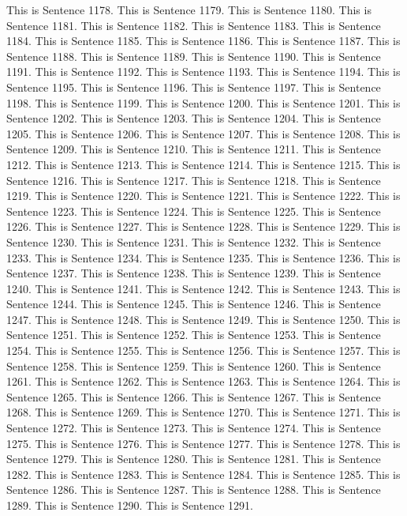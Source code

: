 \documentclass{article}
\begin{document}
This is Sentence 1178.
This is Sentence 1179.
This is Sentence 1180.
This is Sentence 1181.
This is Sentence 1182.
This is Sentence 1183.
This is Sentence 1184.
This is Sentence 1185.
This is Sentence 1186.
This is Sentence 1187.
This is Sentence 1188.
This is Sentence 1189.
This is Sentence 1190.
This is Sentence 1191.
This is Sentence 1192.
This is Sentence 1193.
This is Sentence 1194.
This is Sentence 1195.
This is Sentence 1196.
This is Sentence 1197.
This is Sentence 1198.
This is Sentence 1199.
This is Sentence 1200.
This is Sentence 1201.
This is Sentence 1202.
This is Sentence 1203.
This is Sentence 1204.
This is Sentence 1205.
This is Sentence 1206.
This is Sentence 1207.
This is Sentence 1208.
This is Sentence 1209.
This is Sentence 1210.
This is Sentence 1211.
This is Sentence 1212.
This is Sentence 1213.
This is Sentence 1214.
This is Sentence 1215.
This is Sentence 1216.
This is Sentence 1217.
This is Sentence 1218.
This is Sentence 1219.
This is Sentence 1220.
This is Sentence 1221.
This is Sentence 1222.
This is Sentence 1223.
This is Sentence 1224.
This is Sentence 1225.
This is Sentence 1226.
This is Sentence 1227.
This is Sentence 1228.
This is Sentence 1229.
This is Sentence 1230.
This is Sentence 1231.
This is Sentence 1232.
This is Sentence 1233.
This is Sentence 1234.
This is Sentence 1235.
This is Sentence 1236.
This is Sentence 1237.
This is Sentence 1238.
This is Sentence 1239.
This is Sentence 1240.
This is Sentence 1241.
This is Sentence 1242.
This is Sentence 1243.
This is Sentence 1244.
This is Sentence 1245.
This is Sentence 1246.
This is Sentence 1247.
This is Sentence 1248.
This is Sentence 1249.
This is Sentence 1250.
This is Sentence 1251.
This is Sentence 1252.
This is Sentence 1253.
This is Sentence 1254.
This is Sentence 1255.
This is Sentence 1256.
This is Sentence 1257.
This is Sentence 1258.
This is Sentence 1259.
This is Sentence 1260.
This is Sentence 1261.
This is Sentence 1262.
This is Sentence 1263.
This is Sentence 1264.
This is Sentence 1265.
This is Sentence 1266.
This is Sentence 1267.
This is Sentence 1268.
This is Sentence 1269.
This is Sentence 1270.
This is Sentence 1271.
This is Sentence 1272.
This is Sentence 1273.
This is Sentence 1274.
This is Sentence 1275.
This is Sentence 1276.
This is Sentence 1277.
This is Sentence 1278.
This is Sentence 1279.
This is Sentence 1280.
This is Sentence 1281.
This is Sentence 1282.
This is Sentence 1283.
This is Sentence 1284.
This is Sentence 1285.
This is Sentence 1286.
This is Sentence 1287.
This is Sentence 1288.
This is Sentence 1289.
This is Sentence 1290.
This is Sentence 1291.
\end{document}
